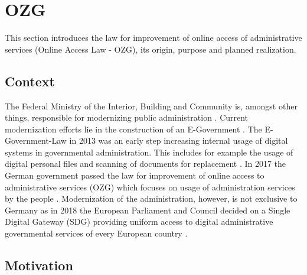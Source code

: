 \documentclass[
     12pt,         %
     a4paper,      %
     BCOR=10mm,version=first,     %
     DIV=14,version=first,        %
     ]{scrreprt}
\begin{document}
\section{OZG}

This section introduces the law for improvement of online access of administrative services (Online Access Law - OZG), its origin, purpose and planned realization.

\subsection{Context}

The Federal Ministry of the Interior, Building and Community is, amongst other things, responsible for modernizing public administration \cite{BMI:Moderne_Verwaltung}. Current modernization efforts lie in the construction of an E-Government \cite{BMI:Behoerdengaenge}.
The E-Government-Law in 2013 was an early step increasing internal usage of digital systems in governmental administration. This includes for example the usage of digital personal files and scanning of documents for replacement \cite{BMI:E-Government_Gesetz}. 
In 2017 the German government passed the law for improvement of online access to administrative services (OZG) which focuses on usage of administration services by the people \cite{BMI:Onlinezugangsgesetz}. 
Modernization of the administration, however, is not exclusive to Germany as in 2018 the European Parliament and Council decided on a Single Digital Gateway (SDG) providing uniform access to digital administrative governmental services of every European country \cite{BMI:Single_Digital_Gateway}.

\subsection{Motivation}
\end{document}

